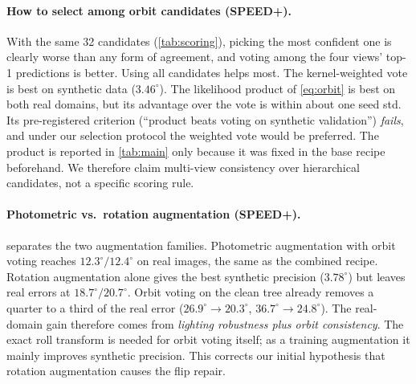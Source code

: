 \begin{table}[t]
  \centering\small
  \setlength{\tabcolsep}{3pt}
  
  \caption{\textbf{Selection rule over the same 32 orbit candidates.}}
  \label{tab:scoring}
\end{table}

\paragraph{How to select among orbit candidates (SPEED+).}
With the same 32 candidates (\cref{tab:scoring}), picking the most confident one is clearly worse than any form of agreement, and voting among the four views' top-1 predictions is better. Using all candidates helps most. The kernel-weighted vote is best on synthetic data ($3.46^\circ$). The likelihood product of \cref{eq:orbit} is best on both real domains, but its advantage over the vote is within about one seed std. Its pre-registered criterion (``product beats voting on synthetic validation'') \emph{fails}, and under our selection protocol the weighted vote would be preferred. The product is reported in \cref{tab:main} only because it was fixed in the base recipe beforehand. We therefore claim multi-view consistency over hierarchical candidates, not a specific scoring rule.

\begin{table}[t]
  \centering\small
  \setlength{\tabcolsep}{2.5pt}
  \resizebox{\linewidth}{!}{}
  \caption{\textbf{Which augmentation matters.} \emph{None} is the clean tree. The roll uses exact labels (\cref{eq:roll}).}
  \label{tab:aug}
\end{table}

\paragraph{Photometric vs.\ rotation augmentation (SPEED+).}
\label{sec:abl_aug}
 separates the two augmentation families. Photometric augmentation with orbit voting reaches $12.3^\circ/12.4^\circ$ on real images, the same as the combined recipe. Rotation augmentation alone gives the best synthetic precision ($3.78^\circ$) but leaves real errors at $18.7^\circ/20.7^\circ$. Orbit voting on the clean tree already removes a quarter to a third of the real error ($26.9^\circ\!\to\!20.3^\circ$, $36.7^\circ\!\to\!24.8^\circ$). The real-domain gain therefore comes from \emph{lighting robustness plus orbit consistency}. The exact roll transform is needed for orbit voting itself; as a training augmentation it mainly improves synthetic precision. This corrects our initial hypothesis that rotation augmentation causes the flip repair.


